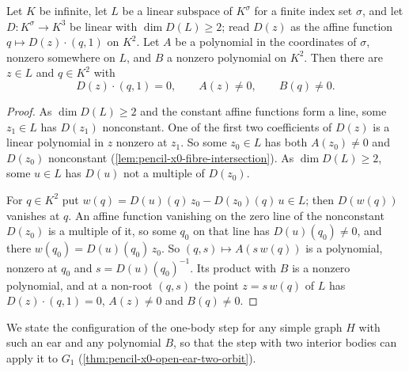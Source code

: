 \begin{lemma}
  \label{lem:pencil-one-ear-incidence}
  \leanok
  Let $K$ be infinite, let $L$ be a linear subspace of $K^\sigma$ for a
  finite index set $\sigma$, and let $D \colon K^\sigma \to K^3$ be linear
  with $\dim D(L) \ge 2$; read $D(z)$ as the affine function
  $q \mapsto D(z) \cdot (q, 1)$ on $K^2$. Let $A$ be a polynomial in the
  coordinates of $\sigma$, nonzero somewhere on $L$, and $B$ a nonzero
  polynomial on $K^2$. Then there are $z \in L$ and $q \in K^2$ with
  \[
    D(z) \cdot (q, 1) = 0, \qquad A(z) \neq 0, \qquad B(q) \neq 0.
  \]
\end{lemma}
\begin{proof}
  \leanok
  As $\dim D(L) \ge 2$ and the constant affine functions form a line, some
  $z_1 \in L$ has $D(z_1)$ nonconstant. One of the first two coefficients
  of $D(z)$ is a linear polynomial in $z$ nonzero at $z_1$. So some
  $z_0 \in L$ has both $A(z_0) \neq 0$ and $D(z_0)$ nonconstant
  (\cref{lem:pencil-x0-fibre-intersection}). As $\dim D(L) \ge 2$, some
  $u \in L$ has $D(u)$ not a multiple of $D(z_0)$.

  For $q \in K^2$ put $w(q) = D(u)(q)\, z_0 - D(z_0)(q)\, u \in L$; then
  $D(w(q))$ vanishes at $q$. An affine function vanishing on the zero line
  of the nonconstant $D(z_0)$ is a multiple of it, so some $q_0$ on that
  line has $D(u)(q_0) \neq 0$, and there $w(q_0) = D(u)(q_0)\, z_0$. So
  $(q, s) \mapsto A(s\, w(q))$ is a polynomial, nonzero at $q_0$ and
  $s = D(u)(q_0)^{-1}$. Its product with $B$ is a nonzero polynomial, and
  at a non-root $(q, s)$ the point $z = s\, w(q)$ of $L$ has
  $D(z) \cdot (q, 1) = 0$, $A(z) \neq 0$ and $B(q) \neq 0$.
\end{proof}

We state the configuration of the one-body step for any simple graph $H$
with such an ear and any polynomial $B$, so that the step with two
interior bodies can apply it to $G_1$
(\cref{thm:pencil-x0-open-ear-two-orbit}).

